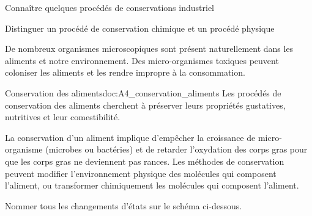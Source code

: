 \teteTermStssAlim
\vspace*{-30pt}


\begin{objectifs}
  \item Connaître quelques procédés de conservations industriel
  \item Distinguer un procédé de conservation chimique et un procédé physique
\end{objectifs}

\begin{contexte}
  De nombreux organismes microscopiques sont présent naturellement dans les aliments et notre environnement.
  Des micro-organismes toxiques peuvent coloniser les aliments et les rendre impropre à la consommation.

\end{contexte}


\begin{doc}{Conservation des aliments}{doc:A4_conservation_aliments}
  Les procédés de conservation des aliments cherchent à préserver leurs propriétés gustatives, nutritives et leur comestibilité.

  La conservation d'un aliment implique d'empêcher la croissance de micro-organisme (microbes ou bactéries) et de retarder l'oxydation des corps gras pour que les corps gras ne deviennent pas rances.
  Les méthodes de conservation peuvent modifier l'environnement physique des molécules qui composent l'aliment, ou transformer chimiquement les molécules qui composent l'aliment.
\end{doc}

\numeroQuestion Nommer tous les changements d'états sur le schéma ci-dessous.

\begin{center}
\end{center}


